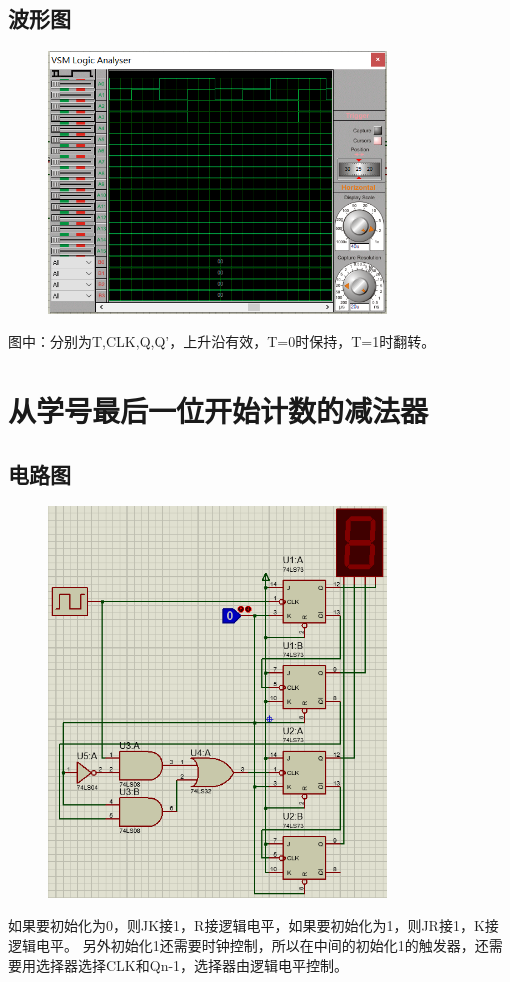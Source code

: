 \documentclass[UTF8, a4paper, 11pt]{article}
\begin{document}
\subsection{波形图}
\begin{figure}[H]
    \centering
    \includegraphics[width=0.8\textwidth]{ex9.9波形图.png}
\end{figure}
图中：分别为T,CLK,Q,Q'，上升沿有效，T=0时保持，T=1时翻转。
\section{从学号最后一位开始计数的减法器}
\subsection{电路图}
\begin{figure}[H]
    \centering
    \includegraphics[width=0.8\textwidth]{ex9.10电路图.png}
\end{figure}
如果要初始化为0，则JK接1，R接逻辑电平，如果要初始化为1，则JR接1，K接逻辑电平。
另外初始化1还需要时钟控制，所以在中间的初始化1的触发器，还需要用选择器选择CLK和Qn-1，选择器由逻辑电平控制。
\end{document}

